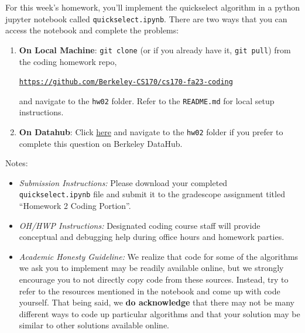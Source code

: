 \documentclass[11pt]{article}
\begin{document}
\newpage


For this week's homework, you'll implement the quickselect algorithm in a python jupyter notebook called \texttt{quickselect.ipynb}. There are two ways that you can access the notebook and complete the problems:
\begin{enumerate}
    \item \textbf{On Local Machine}: \texttt{git clone} (or if you already have it, \texttt{git pull}) from the coding homework repo, 
    
    \href{https://github.com/Berkeley-CS170/cs170-fa23-coding}{\texttt{https://github.com/Berkeley-CS170/cs170-fa23-coding}}
    
    and navigate to the \texttt{hw02} folder. Refer to the \texttt{README.md} for local setup instructions.

    \item \textbf{On Datahub}: Click \href{https://datahub.berkeley.edu/hub/user-redirect/git-pull?repo=https%3A%2F%2Fgithub.com%2FBerkeley-CS170%2Fcs170-fa23-coding&urlpath=tree%2Fcs170-fa23-coding%2Fhw02%2Fquickselect.ipynb&branch=main}{here} and navigate to the \texttt{hw02} folder if you prefer to complete this question on
Berkeley DataHub.
\end{enumerate}

\noindent Notes:
\begin{itemize}
    \item \textit{Submission Instructions:} Please download your completed \texttt{quickselect.ipynb} file and submit it to the gradescope assignment titled ``Homework 2 Coding Portion''. 
    
    \item \textit{OH/HWP Instructions:} Designated coding course staff will provide conceptual and debugging help during office hours and homework parties.
    
    \item \textit{Academic Honesty Guideline:} We realize that code for some of the algorithms we ask you to implement may be readily available online, but we strongly encourage you to not directly copy code from these sources. Instead, try to refer to the resources mentioned in the notebook and come up with code yourself. That being said, we \textbf{do acknowledge} that there may not be many different ways to code up particular algorithms and that your solution may be similar to other solutions available online.
    
\end{itemize}
\end{document}
